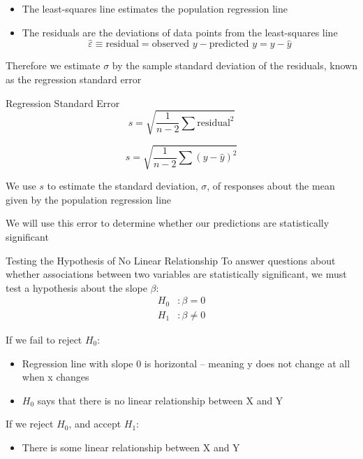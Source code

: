 \documentclass{beamer}
\begin{document}
\begin{frame}{}
	\begin{itemize}
		\item The least-squares line estimates the population regression line
		\item The \alert{residuals} are the deviations of data points from the least-squares line 
			\[ 
				\hat{\varepsilon} \equiv \text{residual}=\text{observed } y  - \text{predicted } y = y - \hat{y}
			\]
	\end{itemize}

	Therefore we estimate $\sigma$ by the sample standard deviation of the residuals, known as the \alert{regression standard error}
\end{frame}

\begin{frame}{Regression Standard Error}
	\[ 
		s=\sqrt{\frac{1}{n-2}\sum\text{residual}^2}
	\]
	
	\[ 
		s=\sqrt{\frac{1}{n-2}\sum(y-\hat{y})^2}
	\]
	
	We use $s$ to estimate the standard deviation, $\sigma$, of responses about the mean given by the population regression line
	
	We will use this error to determine whether our predictions are statistically significant 
\end{frame}

\begin{frame}{Testing the Hypothesis of No Linear Relationship}
	To answer questions about whether associations between two variables are statistically significant, we must test a hypothesis about the slope $\beta$:
	\begin{align*}
		H_0&: \beta=0 \\
		H_1&: \beta \neq 0 
	\end{align*}

	If we fail to reject $H_0$:
	\begin{itemize}
		\item Regression line with slope 0 is horizontal -- meaning y does not change at all when x changes
		
		\item $H_0$ says that there is no linear relationship between X and Y
	\end{itemize}

	If we reject $H_0$, and accept $H_1$:
	\begin{itemize}
		\item There is some linear relationship between X and Y
	\end{itemize}
\end{frame}
\end{document}
